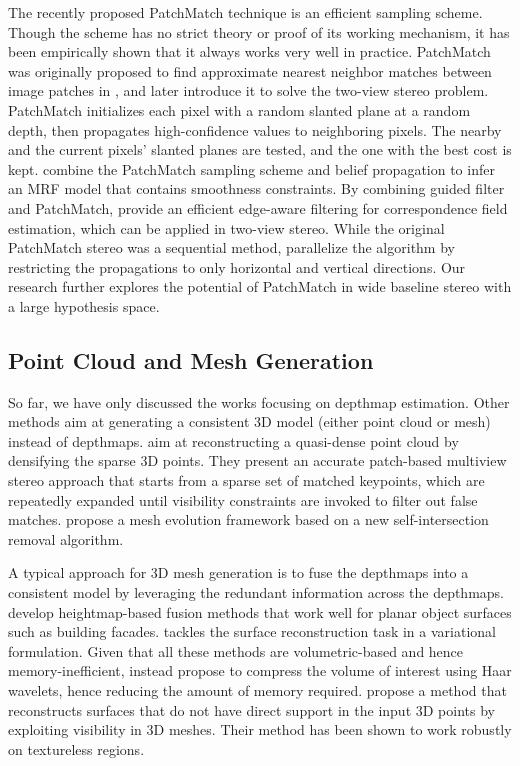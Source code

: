 The recently proposed PatchMatch technique is an efficient sampling scheme. Though the scheme has no strict theory or proof of its working mechanism, it has been empirically shown that it always works very well in practice. PatchMatch was originally proposed to find approximate nearest neighbor matches between image patches in \citet{Barnes:2009:PAR}, and later \citet{patchMatchStereo1} introduce it to solve the two-view stereo problem. PatchMatch initializes each pixel with a random slanted plane at a random depth, then propagates high-confidence values to neighboring pixels. The nearby and the current pixels' slanted planes are tested, and the one with the best cost is kept. \citet{patchMatchStereo2} combine the PatchMatch sampling scheme and belief propagation to infer an MRF model that contains smoothness constraints.
By combining guided filter and PatchMatch, \citet{PMF_Hongsheng} provide an efficient edge-aware filtering for correspondence field estimation, which can be applied in two-view stereo.
While the original PatchMatch stereo was a sequential method, \citet{patchMatchParallel} parallelize the algorithm by restricting the propagations to only horizontal and vertical directions. Our research further explores the potential of PatchMatch in wide baseline stereo with a large hypothesis space.

\subsection{Point Cloud and Mesh Generation}
So far, we have only discussed the works focusing on depthmap estimation. Other methods aim at generating a consistent 3D model (either point cloud or mesh) instead of depthmaps. 
\citet{FURUKAWA_PAMI2010} aim at reconstructing a quasi-dense point cloud by densifying the sparse 3D points. They present an accurate patch-based multiview stereo approach that starts from a sparse set of matched keypoints, which are repeatedly expanded until visibility constraints are invoked to filter out false matches. \citet{Zaharescu_PAMI2011} propose a mesh evolution framework based on a new self-intersection removal algorithm. 

A typical approach for 3D mesh generation is to fuse the depthmaps into a consistent model by leveraging the redundant information across the depthmaps. \citet{gallup20103d,gallup2010heightmap} develop heightmap-based fusion methods that work well for planar object surfaces such as building facades. \citet{zach2008fast} tackles the surface reconstruction task in a variational formulation.
Given that all these methods are volumetric-based and hence memory-inefficient, \citet{zheng2012efficient} instead propose to compress the volume of interest using Haar wavelets, hence reducing the amount of memory required. \citet{JAN} propose a method that reconstructs surfaces that do not have direct support in the input 3D points by exploiting visibility in 3D meshes. Their method has been shown to work robustly on  textureless regions.

